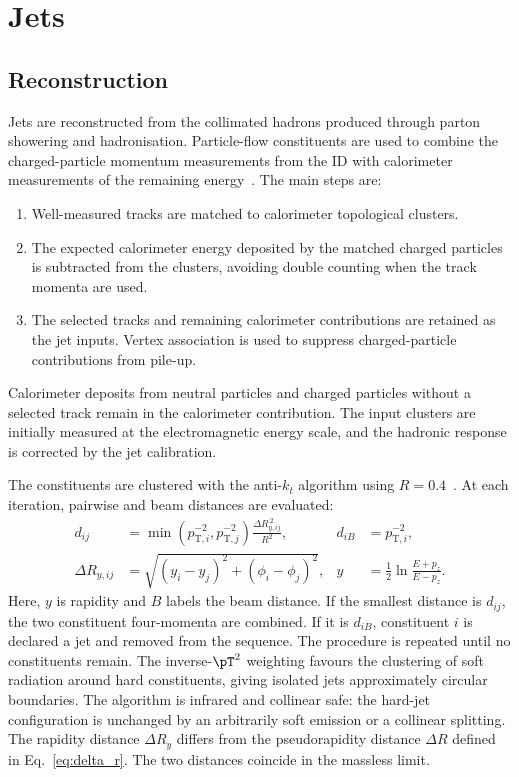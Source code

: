 \section{Jets}
\label{sec:ch6_jets}

\subsection{Reconstruction}

Jets are reconstructed from the collimated hadrons produced through parton showering and hadronisation.
Particle-flow constituents are used to combine the charged-particle momentum measurements from the ID with calorimeter measurements of the remaining energy~\cite{ATLAS2017ParticleFlow}.
The main steps are:
\begin{enumerate}
    \item Well-measured tracks are matched to calorimeter topological clusters.
    \item The expected calorimeter energy deposited by the matched charged particles is subtracted from the clusters, avoiding double counting when the track momenta are used.
    \item The selected tracks and remaining calorimeter contributions are retained as the jet inputs. Vertex association is used to suppress charged-particle contributions from pile-up.
\end{enumerate}
Calorimeter deposits from neutral particles and charged particles without a selected track remain in the calorimeter contribution.
The input clusters are initially measured at the electromagnetic energy scale, and the hadronic response is corrected by the jet calibration.

The constituents are clustered with the anti-$k_t$ algorithm using $R=0.4$~\cite{Cacciari2008AntiKt}.
At each iteration, pairwise and beam distances are evaluated:
\begin{align}
    d_{ij}&=\min\!\left(p_{\mathrm{T},i}^{-2},p_{\mathrm{T},j}^{-2}\right)
       \frac{\Delta R_{y,ij}^{\,2}}{R^2},
    &d_{iB}&=p_{\mathrm{T},i}^{-2},
    \label{eq:ch6_antikt}\\
    \Delta R_{y,ij}&=\sqrt{(y_i-y_j)^2+(\phi_i-\phi_j)^2},
    &y&=\frac{1}{2}\ln\frac{E+p_z}{E-p_z}.
    \label{eq:ch6_rapidity}
\end{align}
Here, $y$ is rapidity and $B$ labels the beam distance.
If the smallest distance is $d_{ij}$, the two constituent four-momenta are combined.
If it is $d_{iB}$, constituent $i$ is declared a jet and removed from the sequence.
The procedure is repeated until no constituents remain.
The inverse-$\pT^2$ weighting favours the clustering of soft radiation around hard constituents, giving isolated jets approximately circular boundaries.
The algorithm is infrared and collinear safe: the hard-jet configuration is unchanged by an arbitrarily soft emission or a collinear splitting.
The rapidity distance $\Delta R_y$ differs from the pseudorapidity distance $\Delta R$ defined in Eq.~\eqref{eq:delta_r}.
The two distances coincide in the massless limit.

